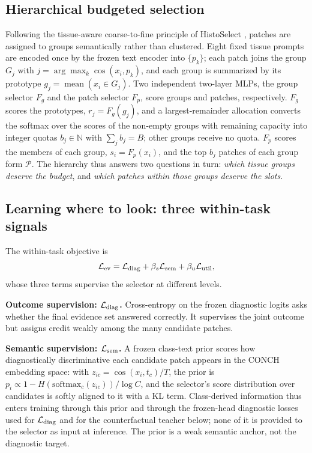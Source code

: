 \documentclass{article}
\def\L{{\cal L}}
\newcommand{\Fg}{F_g}
\newcommand{\Fp}{F_p}
\newcommand{\Psel}{\mathcal{P}}
\begin{document}
\subsection{Hierarchical budgeted selection}
\label{ssec:hier}

Following the tissue-aware coarse-to-fine principle of HistoSelect \cite{huang2026histoselect}, patches are assigned to groups semantically rather than clustered. Eight fixed tissue prompts are encoded once by the frozen text encoder into $\{p_k\}$; each patch joins the group $G_j$ with $j=\arg\max_k\cos(x_i,p_k)$, and each group is summarized by its prototype $g_j=\operatorname{mean}(x_i\in G_j)$. Two independent two-layer MLPs, the group selector $\Fg$ and the patch selector $\Fp$, score groups and patches, respectively. $\Fg$ scores the prototypes, $r_j=\Fg(g_j)$, and a largest-remainder allocation converts the softmax over the scores of the non-empty groups with remaining capacity into integer quotas $b_j\in\mathbb{N}$ with $\sum_j b_j=B$; other groups receive no quota. $\Fp$ scores the members of each group, $s_i=\Fp(x_i)$, and the top $b_j$ patches of each group form $\Psel$. The hierarchy thus answers two questions in turn: \emph{which tissue groups deserve the budget}, and \emph{which patches within those groups deserve the slots}.

\subsection{Learning where to look: three within-task signals}
\label{ssec:within}

The within-task objective is
\begin{equation}
\L_{\mathrm{ev}}
=
\L_{\mathrm{diag}}
+\beta_s\L_{\mathrm{sem}}
+\beta_u\L_{\mathrm{util}},
\end{equation}
whose three terms supervise the selector at different levels.

\textbf{Outcome supervision: $\L_{\mathrm{diag}}$.}
Cross-entropy on the frozen diagnostic logits asks whether the final evidence set answered correctly. It supervises the joint outcome but assigns credit weakly among the many candidate patches.

\textbf{Semantic supervision: $\L_{\mathrm{sem}}$.}
A frozen class-text prior scores how diagnostically discriminative each candidate patch appears in the CONCH embedding space: with $z_{ic}=\cos(x_i,t_c)/T$, the prior is $p_i\propto 1-H(\mathrm{softmax}_c(z_{ic}))/\log C$, and the selector's score distribution over candidates is softly aligned to it with a KL term. Class-derived information thus enters training through this prior and through the frozen-head diagnostic losses used for $\L_{\rm diag}$ and for the counterfactual teacher below; none of it is provided to the selector as input at inference. The prior is a weak semantic anchor, not the diagnostic target.
\end{document}
